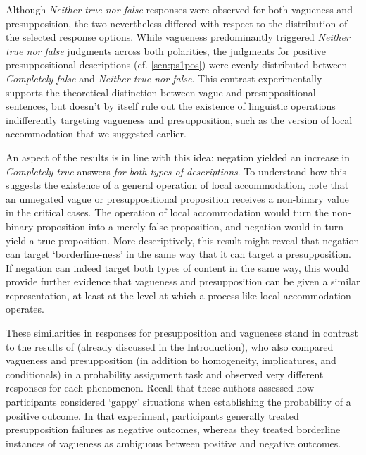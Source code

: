 \documentclass[12pt, letterpaper]{article}
\begin{document}
{Although \textit{Neither true nor false} responses were observed for both vagueness and presupposition, the two nevertheless differed with respect to the distribution of the selected response options. While vagueness predominantly triggered \textit{Neither true nor false} judgments across both polarities, the judgments for positive presuppositional descriptions (cf. \ref{sen:ps1pos}) were evenly distributed between \textit{Completely false} and \textit{Neither true nor false}. This contrast experimentally supports the theoretical distinction between vague and presuppositional sentences, but doesn't by itself rule out the existence of linguistic operations indifferently targeting vagueness and presupposition, such as the version of local accommodation that we suggested earlier.

An aspect of the results is in line with this idea: negation yielded an increase in \textit{Completely true} answers \textit{for both types of descriptions}. To understand how this suggests the existence of a general operation of local accommodation, note that an unnegated vague or presuppositional proposition receives a non-binary value in the critical cases. The operation of local accommodation would turn the non-binary proposition into a merely false proposition, and negation would in turn yield a true proposition. %
More descriptively, this result might reveal that negation can target `borderline-ness' in the same way that it can target a presupposition.%
 If negation can indeed target both types of content in the same way, this would provide further evidence that vagueness and presupposition can be given a similar representation, at least at the level at which a process like local accommodation operates.

These similarities in responses for presupposition and vagueness stand in contrast to the results of \cite{Cremers:2015a} (already discussed in the Introduction), who also compared vagueness and presupposition (in addition to homogeneity, implicatures, and conditionals) in a probability assignment task and observed very different responses for each phenomenon. Recall that these authors assessed how participants considered `gappy' situations when establishing the probability of a positive outcome. In that experiment, participants generally treated presupposition failures as negative outcomes, whereas they treated borderline instances of vagueness as ambiguous between positive and negative outcomes.

}
\end{document}
